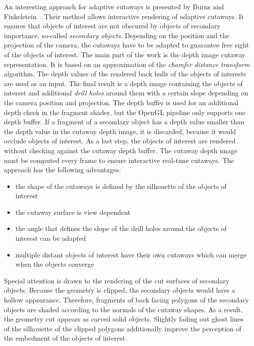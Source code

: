 An interesting approach for adaptive cutaways is presented by Burns and Finkelstein~\cite{jour:adaptiveCutaways}. Their method allows interactive rendering of adaptive cutaways. It ensures that objects of interest are not obscured by objects of secondary importance, so-called \emph{secondary objects}. Depending on the position and the projection of the camera, the cutaways have to be adapted to guarantee free sight of the objects of interest. The main part of the work is the depth image cutaway representation. It is based on an approximation of the \emph{chamfer distance transform} algorithm. The depth values of the rendered back hulls of the objects of interests are used as an input. The final result is a depth image containing the objects of interest and additional \emph{drill holes} around them with a certain slope depending on the camera position and projection. The depth buffer is used for an additional depth check in the fragment shader, but the OpenGL pipeline only supports one depth buffer. If a fragment of a secondary object has a depth value smaller than the depth value in the cutaway depth image, it is discarded, because it would occlude objects of interest. As a last step, the objects of interest are rendered without checking against the cutaway depth buffer. The cutaway depth image must be computed every frame to ensure interactive real-time cutaways. The approach has the following advantages:
\begin{itemize}
	\item the shape of the cutaways is defined by the silhouette of the objects of interest
	\item the cutaway surface is view dependent
	\item the angle that defines the slope of the drill holes around the objects of interest can be adapted
	\item multiple distant objects of interest have their own cutaways which can merge when the objects converge
\end{itemize}

Special attention is drawn to the rendering of the cut surfaces of secondary objects. Because the geometry is clipped, the secondary objects would have a hollow appearance. Therefore, fragments of back facing polygons of the secondary objects are shaded according to the normals of the cutaway shapes. As a result, the geometry cut appears as carved solid objects. Slightly fading out ghost lines of the silhouette of the clipped polygons additionally improve the perception of the embedment of the objects of interest.

